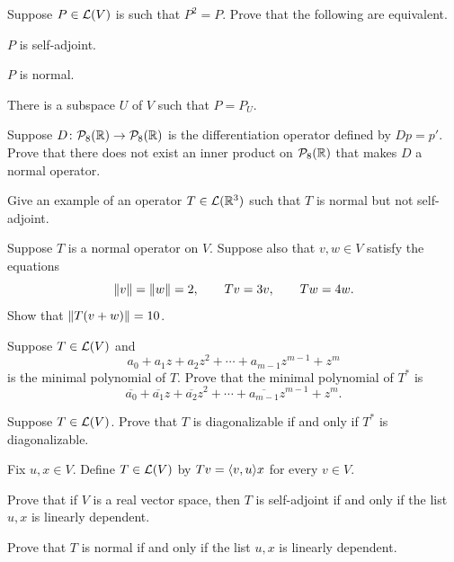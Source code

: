 \begin{exc}
\begin{exercise}
Suppose $P\in\mathcal{L}(V)$ is such that $P^2=P$. Prove that the following are
equivalent.
\begin{parts}
\item $P$ is self-adjoint.
\item $P$ is normal.
\item There is a subspace $U$ of $V$ such that $P=P_U$.
\end{parts}
\end{exercise}

\begin{exercise}
Suppose $D\colon\mathcal{P}_8(\mathbb{R})\to\mathcal{P}_8(\mathbb{R})$ is the differentiation operator
defined by $Dp=p'$. Prove that there does not exist an inner product on
$\mathcal{P}_8(\mathbb{R})$ that makes $D$ a normal operator.
\end{exercise}

\begin{exercise}
Give an example of an operator $T\in\mathcal{L}(\mathbb{R}^3)$ such that $T$ is normal but not
self-adjoint.
\end{exercise}

\begin{exercise}
Suppose $T$ is a normal operator on $V$. Suppose also that $v,w\in V$ satisfy
the equations
\[ \lVert v \rVert=\lVert w \rVert=2, \qquad Tv=3v, \qquad Tw=4w. \]
Show that $\lVert T(v+w) \rVert=10$.
\end{exercise}

\begin{exercise}
Suppose $T\in\mathcal{L}(V)$ and
\[ a_0+a_1z+a_2z^2+\cdots+a_{m-1}z^{m-1}+z^m \]
is the minimal polynomial of $T$. Prove that the minimal polynomial of $T^*$ is
\[ \overline{a_0}+\overline{a_1}z+\overline{a_2}z^2+\cdots
   +\overline{a_{m-1}}z^{m-1}+z^m. \]
\end{exercise}

\begin{exercise}
Suppose $T\in\mathcal{L}(V)$. Prove that $T$ is diagonalizable if and only if $T^*$ is
diagonalizable.
\end{exercise}

\begin{exercise}
Fix $u,x\in V$. Define $T\in\mathcal{L}(V)$ by $Tv=\langle v, u \rangle x$ for every $v\in V$.
\begin{parts}
\item Prove that if $V$ is a real vector space, then $T$ is self-adjoint if and
  only if the list $u,x$ is linearly dependent.
\item Prove that $T$ is normal if and only if the list $u,x$ is linearly
  dependent.
\end{parts}
\end{exercise}


\end{exc}
